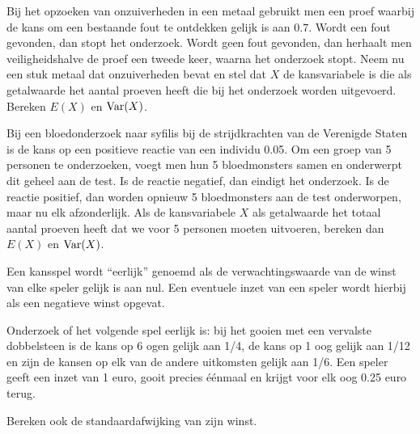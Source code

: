 \documentclass[12pt,twoside]{article}
\begin{document}
\begin{oefening}
Bij het opzoeken van onzuiverheden in een metaal gebruikt men een proef waarbij de kans om een bestaande fout te ontdekken gelijk is aan $0.7$. Wordt een fout gevonden, dan stopt het onderzoek. Wordt geen fout gevonden, dan herhaalt men veiligheidshalve de proef een tweede keer, waarna het onderzoek stopt. Neem nu een stuk metaal dat onzuiverheden bevat en stel dat $X$ de kansvariabele is die als getalwaarde het aantal proeven heeft die bij het onderzoek worden uitgevoerd. Bereken $E(X)$ en $\Var(X)$.
\end{oefening}

\begin{oefening}
Bij een bloedonderzoek naar syfilis bij de strijdkrachten van de Verenigde Staten is de kans op een positieve reactie van een individu 0.05. Om een groep van 5 personen te onderzoeken, voegt men hun 5 bloedmonsters samen en onderwerpt dit geheel aan de test. Is de reactie negatief, dan eindigt het onderzoek. Is de reactie positief, dan worden opnieuw 5 bloedmonsters aan de test onderworpen, maar nu elk afzonderlijk. Als de kansvariabele $X$ als getalwaarde het totaal aantal proeven heeft dat we voor 5 personen moeten uitvoeren, bereken dan $E(X)$ en $\Var(X)$.
\end{oefening}

\begin{oefening}
Een kansspel wordt “eerlijk” genoemd als de verwachtingswaarde van de winst van elke speler gelijk is aan nul. Een eventuele inzet van een speler wordt hierbij als een negatieve winst opgevat.

Onderzoek of het volgende spel eerlijk is: bij het gooien met een vervalste dobbelsteen is de kans op 6 ogen gelijk aan 1/4, de kans op 1 oog gelijk aan 1/12 en zijn de kansen op elk van de andere uitkomsten gelijk aan 1/6. Een speler geeft een inzet van 1 euro, gooit precies éénmaal en krijgt voor elk oog 0.25 euro terug.

Bereken ook de standaardafwijking van zijn winst.
\end{oefening}
\end{document}

